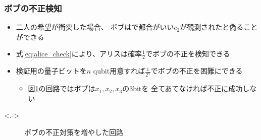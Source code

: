 \begin{frame}
  \frametitle{ボブの不正検知}

  \pause
  \begin{itemize}
    \item<+-> 二人の希望が衝突した場合、
    ボブはで都合がいい$c_2$が観測されたと偽ることができる

    \item<+-> 式\ref{eq:alice_check}により、アリスは確率$\frac{1}{2}$でボブの不正を検知できる

    \item<+-> 検証用の量子ビットを$n$ qubit用意すれば$\frac{1}{2^n}$でボブの不正を困難にできる
    \begin{itemize}
      \item 図\ref{fig:bob_cheat_detection}の回路ではボブは$x_1, x_2, x_3$の3bitを
      全てあてなければ不正に成功しない
    \end{itemize}
  \end{itemize}

  \uncover<.->{%
    \begin{figure}
      \caption{ボブの不正対策を増やした回路}
      \label{fig:bob_cheat_detection}
    \end{figure}
  }
\end{frame}


